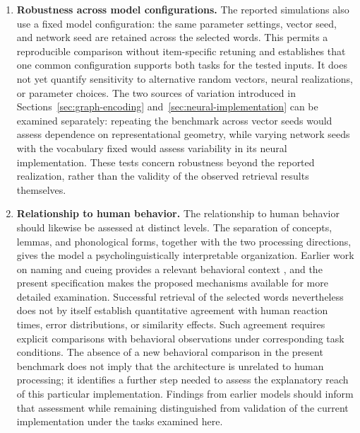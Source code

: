 \begin{enumerate}
\item \textbf{Robustness across model configurations.} The reported simulations also use a fixed model configuration: the same parameter settings, vector seed, and network seed are retained across the selected words. This permits a reproducible comparison without item-specific retuning and establishes that one common configuration supports both tasks for the tested inputs. It does not yet quantify sensitivity to alternative random vectors, neural realizations, or parameter choices. The two sources of variation introduced in Sections~\ref{sec:graph-encoding} and~\ref{sec:neural-implementation} can be examined separately: repeating the benchmark across vector seeds would assess dependence on representational geometry, while varying network seeds with the vocabulary fixed would assess variability in its neural implementation. These tests concern robustness beyond the reported realization, rather than the validity of the observed retrieval results themselves.

\item \textbf{Relationship to human behavior.} The relationship to human behavior should likewise be assessed at distinct levels. The separation of concepts, lemmas, and phonological forms, together with the two processing directions, gives the model a psycholinguistically interpretable organization. Earlier work on naming and cueing provides a relevant behavioral context \citep{stille2020}, and the present specification makes the proposed mechanisms available for more detailed examination. Successful retrieval of the selected words nevertheless does not by itself establish quantitative agreement with human reaction times, error distributions, or similarity effects. Such agreement requires explicit comparisons with behavioral observations under corresponding task conditions. The absence of a new behavioral comparison in the present benchmark does not imply that the architecture is unrelated to human processing; it identifies a further step needed to assess the explanatory reach of this particular implementation. Findings from earlier models should inform that assessment while remaining distinguished from validation of the current implementation under the tasks examined here.


\end{enumerate}
